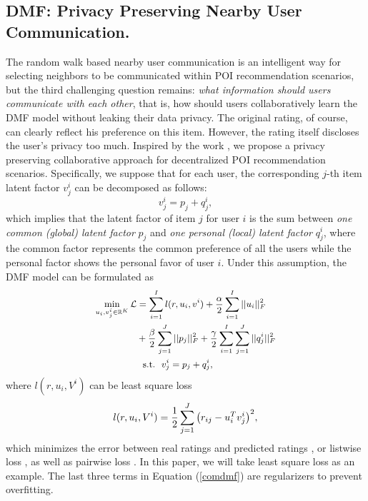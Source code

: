 \subsection{DMF: Privacy Preserving Nearby User Communication.} 
The random walk based nearby user communication is an intelligent way for selecting neighbors to be communicated within POI recommendation scenarios, but the third challenging question remains: \textit{what information should users communicate with each other}, that is, how should users collaboratively learn the DMF model without leaking their data privacy. 
The original rating, of course, can clearly reflect his preference on this item. 
However, the rating itself discloses the user's privacy too much. 
Inspired by the work \cite{yan2013distributed}, we propose a privacy preserving collaborative approach for decentralized POI recommendation scenarios. 
Specifically, we suppose that for each user, the corresponding $j$-th item latent factor $v^i_j$ can be decomposed as follows: 
\begin{equation}\label{decom1}
v^i_j=p_j+q^i_j,
\end{equation} 
which implies that the latent factor of item $j$ for user $i$ is the sum between \textit{one common (global) latent factor} $p_j$ and \textit{one personal (local) latent factor} $q^i_j$, where the common factor represents the common preference of all the users while the personal factor shows the personal favor of user $i$. 
Under this assumption, the DMF model can be formulated as 
\begin{equation}\small
\label{comdmf}
\begin{split}
	\mathop { \min }\limits_{u_i,v^i_j \in \mathbb{R}^K} \mathcal{L} 
	& = \sum\limits_{i=1}^{I} l(r,u_i,v^i) + \frac{\alpha}{2} \sum\limits_{i=1}^I  ||{u_i}||_F^2 \\
	& + \frac{\beta}{2} \sum\limits_{j=1}^J||p_j||_F^2 + \frac{\gamma}{2} \sum\limits_{i=1}^I \sum\limits_{j=1}^J||q^i_j||_F^2 \\
	& ~~{\rm s.t.} ~~ v^i_j=p_j+q^i_j,
\end{split}	
\end{equation} 
where $l(r,u_i,V^i)$ can be least square loss
\begin{equation}\small
l(r,u_i,V^i)=\frac{1}{2}\sum\limits_{j=1}^{J}{\left(r_{ij} - u_i^T v^i_j\right)}^2,
\end{equation} 
which minimizes the error between real ratings and predicted ratings \cite{mnih2007probabilistic}, or listwise loss \cite{shi2010list}, as well as pairwise loss \cite{rendle2009bpr}. 
In this paper, we will take least square loss as an example. 
The last three terms in Equation (\ref{comdmf}) are regularizers to prevent overfitting. 


